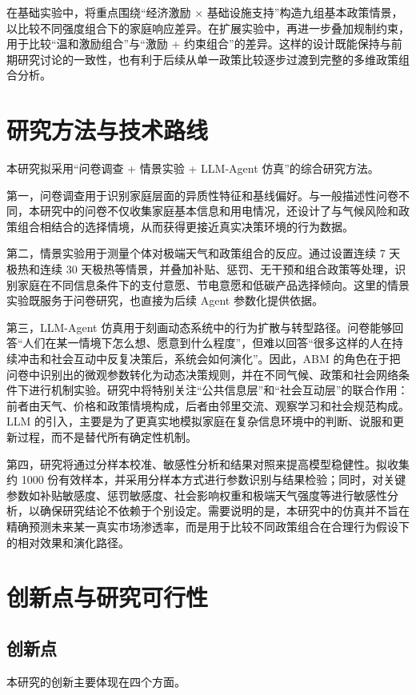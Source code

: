 \documentclass[12pt,a4paper]{ctexart}
\begin{document}
在基础实验中，将重点围绕“经济激励 × 基础设施支持”构造九组基本政策情景，以比较不同强度组合下的家庭响应差异。在扩展实验中，再进一步叠加规制约束，用于比较“温和激励组合”与“激励 + 约束组合”的差异。这样的设计既能保持与前期研究讨论的一致性，也有利于后续从单一政策比较逐步过渡到完整的多维政策组合分析。

\section{研究方法与技术路线}
本研究拟采用“问卷调查 + 情景实验 + LLM-Agent 仿真”的综合研究方法。

第一，问卷调查用于识别家庭层面的异质性特征和基线偏好。与一般描述性问卷不同，本研究中的问卷不仅收集家庭基本信息和用电情况，还设计了与气候风险和政策组合相结合的选择情境，从而获得更接近真实决策环境的行为数据。

第二，情景实验用于测量个体对极端天气和政策组合的反应。通过设置连续 7 天极热和连续 30 天极热等情景，并叠加补贴、惩罚、无干预和组合政策等处理，识别家庭在不同信息条件下的支付意愿、节电意愿和低碳产品选择倾向。这里的情景实验既服务于问卷研究，也直接为后续 Agent 参数化提供依据。

第三，LLM-Agent 仿真用于刻画动态系统中的行为扩散与转型路径。问卷能够回答“人们在某一情境下怎么想、愿意到什么程度”，但难以回答“很多这样的人在持续冲击和社会互动中反复决策后，系统会如何演化”。因此，ABM 的角色在于把问卷中识别出的微观参数转化为动态决策规则，并在不同气候、政策和社会网络条件下进行机制实验。研究中将特别关注“公共信息层”和“社会互动层”的联合作用：前者由天气、价格和政策情境构成，后者由邻里交流、观察学习和社会规范构成。LLM 的引入，主要是为了更真实地模拟家庭在复杂信息环境中的判断、说服和更新过程，而不是替代所有确定性机制。

第四，研究将通过分样本校准、敏感性分析和结果对照来提高模型稳健性。拟收集约 1000 份有效样本，并采用分样本方式进行参数识别与结果检验；同时，对关键参数如补贴敏感度、惩罚敏感度、社会影响权重和极端天气强度等进行敏感性分析，以确保研究结论不依赖于个别设定。需要说明的是，本研究中的仿真并不旨在精确预测未来某一真实市场渗透率，而是用于比较不同政策组合在合理行为假设下的相对效果和演化路径。

\section{创新点与研究可行性}
\subsection{创新点}
本研究的创新主要体现在四个方面。
\end{document}
